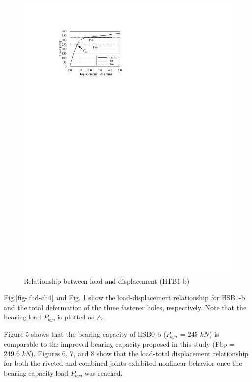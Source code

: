 \begin{figure}
\begin{minipage}[t]{0.48\textwidth}
    \includegraphics{imgs/ch4/ld-htb1b.pdf}
    \caption{Relationship between load and displacement (HTB1-b)}
    \label{fig-8ch4}
    \end{minipage}
    
\end{figure}

Fig.\ref{fig-lfhd-ch4} and Fig. \ref{fig-8ch4} show the load-displacement relationship for HSB1-b and the total deformation of the three fastener holes, respectively. Note that the bearing load $P_{bya}$ is plotted as △.

Figure 5 shows that the bearing capacity of HSB0-b ($P_{bya}$ = 245 $kN$) is comparable to the improved bearing capacity proposed in this study (Fbp = 249.6 $kN$). Figures 6, 7, and 8 show that the load-total displacement relationship for both the riveted and combined joints exhibited nonlinear behavior once the bearing capacity load $P_{bya}$ was reached.

